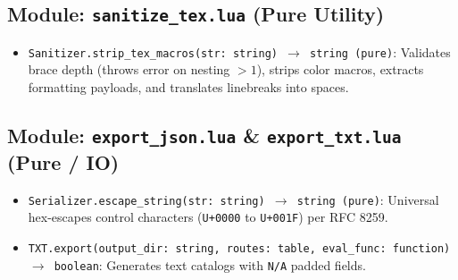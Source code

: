 \subsection{Module: \texttt{sanitize\_tex.lua} (Pure Utility)}
{\small
\begin{itemize}
    \item \texttt{Sanitizer.strip\_tex\_macros(str: string) $\to$ string (pure)}: Validates brace depth (throws error on nesting $>1$), strips color macros, extracts formatting payloads, and translates linebreaks into spaces.
\end{itemize}
}

\subsection{Module: \texttt{export\_json.lua} \& \texttt{export\_txt.lua} (Pure / IO)}
{\small
\begin{itemize}
    \item \texttt{Serializer.escape\_string(str: string) $\to$ string (pure)}: Universal hex-escapes control characters (\texttt{U+0000} to \texttt{U+001F}) per RFC 8259.
    \item \texttt{TXT.export(output\_dir: string, routes: table, eval\_func: function) $\to$ boolean}: Generates text catalogs with \texttt{N/A} padded fields.
\end{itemize}
}
